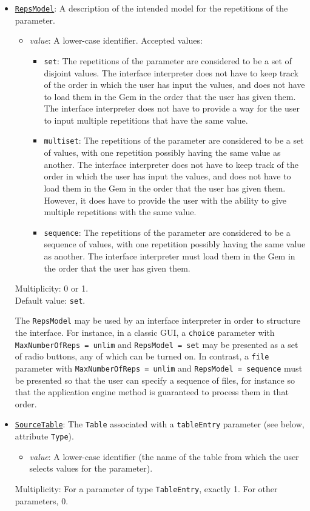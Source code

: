 \documentclass[11pt]{article}
\begin{document}
\begin{itemize}
\item \underline{\tt RepsModel}:  A description of the intended
model for the repetitions of the parameter.
\begin{itemize}
\item {\it value}: A lower-case identifier.  Accepted values:
  \begin{itemize}
  \item {\tt set}:  The repetitions of the parameter are considered
    to be a set of disjoint values.  The interface interpreter does not have
    to keep track of the order in which the user has input the
    values, and does not have to load them in the Gem in the
    order that the user has given them.  The interface interpreter
    does not have to provide a way for the user to input multiple
    repetitions that have the same value.
  \item {\tt multiset}:  The repetitions of the parameter are considered
    to be a set of values, with one repetition possibly having the
    same value as another.  The interface interpreter does not have
    to keep track of the order in which the user has input the
    values, and does not have to load them in the Gem in the
    order that the user has given them.  However, it does have to
    provide the user with the ability to give multiple repetitions
    with the same value.
  \item {\tt sequence}:  The repetitions of the parameter are
    considered to be a sequence of values, with one repetition
    possibly having the same value as another.  The interface
    interpreter must load them in the Gem in the order that
    the user has given them.
  \end{itemize}
\end{itemize}
Multiplicity: 0 or 1. \\
Default value: {\tt set}.

The {\tt RepsModel} may be used by an interface interpreter in order
to structure the interface.  For instance, in a classic GUI, a {\tt choice}
parameter with {\tt MaxNumberOfReps = unlim} and {\tt RepsModel = set} may
be presented as a set of radio buttons, any of which can be turned on.
In contrast, a {\tt file} parameter 
with {\tt MaxNumberOfReps = unlim} and {\tt RepsModel = sequence} must
be presented so that the user can specify a sequence of files, for
instance so that the application engine method is guaranteed to process
them in that order.

\item \underline{\tt SourceTable}:  The {\tt Table} associated
with a {\tt tableEntry} parameter (see below, attribute {\tt Type}).
\begin{itemize}
\item {\it value}: A lower-case identifier (the name of the
  table from which the user selects values for the parameter).
\end{itemize}
Multiplicity: For a parameter of type {\tt TableEntry}, exactly 1.
For other parameters, 0.


\end{itemize}
\end{document}
